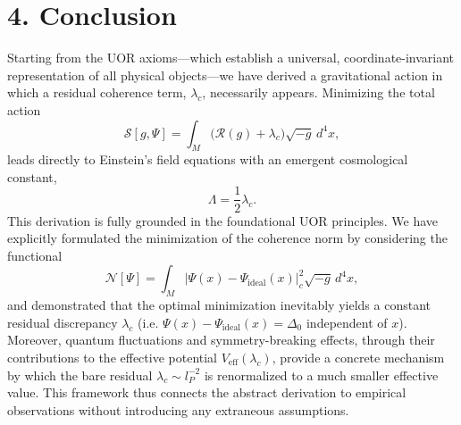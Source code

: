 \documentclass[12pt]{article}
\begin{document}
\section*{4. Conclusion}
Starting from the UOR axioms—which establish a universal, coordinate-invariant representation of all physical objects—we have derived a gravitational action in which a residual coherence term, \(\lambda_c\), necessarily appears. Minimizing the total action
\[
\mathcal{S}[g,\Psi] = \int_M \Big( \mathcal{R}(g) + \lambda_c \Big) \sqrt{-g}\, d^4x,
\]
leads directly to Einstein’s field equations with an emergent cosmological constant,
\[
\Lambda = \frac{1}{2}\lambda_c.
\]
This derivation is fully grounded in the foundational UOR principles. We have explicitly formulated the minimization of the coherence norm by considering the functional
\[
\mathcal{N}[\Psi] = \int_M \lvert \Psi(x) - \Psi_{\mathrm{ideal}}(x)\rvert_c^2 \sqrt{-g}\, d^4x,
\]
and demonstrated that the optimal minimization inevitably yields a constant residual discrepancy \(\lambda_c\) (i.e. \(\Psi(x)-\Psi_{\mathrm{ideal}}(x)=\Delta_0\) independent of \(x\)). Moreover, quantum fluctuations and symmetry-breaking effects, through their contributions to the effective potential \(V_{\text{eff}}(\lambda_c)\), provide a concrete mechanism by which the bare residual \(\lambda_c \sim l_P^{-2}\) is renormalized to a much smaller effective value. This framework thus connects the abstract derivation to empirical observations without introducing any extraneous assumptions.
\end{document}
